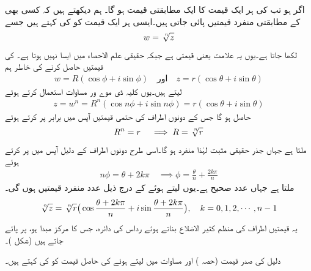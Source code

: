 اگر  ہو تب  کی ہر ایک قیمت کا ایک مطابقتی  قیمت ہو گا۔  ہم دیکھتے ہیں کہ کسی بھی  کے مطابقتی  منفرد  قیمتیں پائی جاتی ہیں۔ایسی ہر ایک قیمت کو  کی   کہتے ہیں جسے
\begin{align}
w=\sqrt[\leftroot{-2}\uproot{2}n]{z}
\end{align}
لکھا جاتا ہے۔یوں یہ علامت   یعنی  قیمتی ہے جبکہ حقیقی علم الاحصاء میں ایسا نہیں ہوتا ہے۔   کی  قیمتیں حاصل کرنے کی خاطر ہم
\begin{align*}
w=R(\cos\phi+i\sin\phi)\quad \text{اور}\quad z=r(\cos\theta+i\sin\theta)
\end{align*}
لیتے ہیں۔یوں کلیہ ڈی موے ور مساوات  استعمال کرتے ہوئے
\begin{align*}
z=w^n=R^n(\cos n\phi+i\sin n\phi)=r(\cos\theta+i\sin\theta)
\end{align*}
حاصل ہو گا جس کے دونوں اطراف کی حتمی قیمتیں آپس میں برابر پر کرتے ہوئے
\begin{align}
R^n=r\quad \implies R=\sqrt[\leftroot{-2}\uproot{2}n]{r}
\end{align}
ملتا ہے جہاں جذر حقیقی مثبت لہٰذا منفرد ہو گا۔اسی طرح دونوں اطراف کے دلیل آپس میں پر کرتے ہوئے 
\begin{align*}
n\phi=\theta+2k\pi\quad \implies \phi=\frac{\theta}{n}+\frac{2k\pi}{n}
\end{align*}
ملتا ہے جہاں  عدد صحیح ہے۔یوں  لیتے ہوئے  کے درج ذیل  عدد منفرد قیمتیں ہوں گی۔
\begin{align}\label{مساوات_مخلوط_جذر_الف}
\sqrt[\leftroot{-2}\uproot{2}n]{z}=\sqrt[\leftroot{-2}\uproot{2}n]{r}\big(\cos\frac{\theta+2k \pi}{n}+i\sin\frac{\theta+2k\pi}{n}\big),\quad k=0,1,2,\cdots,n-1
\end{align}
یہ  قیمتیں  اطراف کی منظم کثیر الاضلاع بناتے ہوئے رداس  کی دائرہ، جس کا مرکز مبدا ہو، پر پائے جاتے ہیں (شکل )۔

دلیل  کی صدر قیمت (حصہ ) اور مساوات  میں  لیتے ہوئے   کی حاصل قیمت کو  کی  کہتے ہیں۔ 

